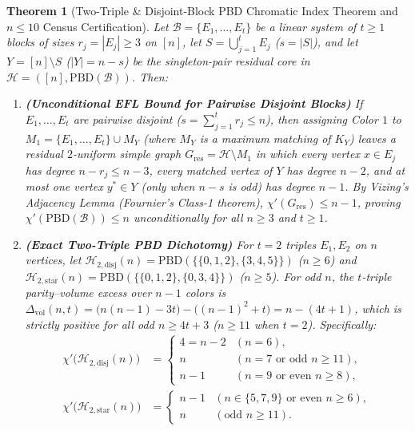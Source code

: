 \documentclass[11pt,reqno]{amsart}
\newtheorem{theorem}{Theorem}[section]
\theoremstyle{definition}
\theoremstyle{remark}
\begin{document}
\begin{theorem}[Two-Triple \& Disjoint-Block PBD Chromatic Index Theorem and $n \le 10$ Census Certification]\label{thm:two_triple_disjoint}
Let $\mathcal{B} = \{E_1, \dots, E_t\}$ be a linear system of $t \ge 1$ blocks of sizes $r_j = |E_j| \ge 3$ on $[n]$, let $S = \bigcup_{j=1}^t E_j$ ($s = |S|$), and let $Y = [n] \setminus S$ ($|Y| = n - s$) be the singleton-pair residual core in $\mathcal{H} = ([n], \mathrm{PBD}(\mathcal{B}))$. Then:
\begin{enumerate}
  \item[\textup{(i)}] \textbf{(Unconditional EFL Bound for Pairwise Disjoint Blocks)} If $E_1, \dots, E_t$ are pairwise disjoint ($s = \sum_{j=1}^t r_j \le n$), then assigning Color $1$ to $M_1 = \{E_1, \dots, E_t\} \cup M_Y$ (where $M_Y$ is a maximum matching of $K_Y$) leaves a residual $2$-uniform simple graph $G_{\mathrm{res}} = \mathcal{H} \setminus M_1$ in which every vertex $x \in E_j$ has degree $n - r_j \le n - 3$, every matched vertex of $Y$ has degree $n - 2$, and at most one vertex $y^* \in Y$ (only when $n - s$ is odd) has degree $n - 1$. By Vizing's Adjacency Lemma (Fournier's Class-1 theorem), $\chi'(G_{\mathrm{res}}) \le n - 1$, proving $\chi'(\mathrm{PBD}(\mathcal{B})) \le n$ unconditionally for all $n \ge 3$ and $t \ge 1$.
  \item[\textup{(ii)}] \textbf{(Exact Two-Triple PBD Dichotomy)} For $t = 2$ triples $E_1, E_2$ on $n$ vertices, let $\mathcal{H}_{2,\mathrm{disj}}(n) = \mathrm{PBD}(\{\{0,1,2\},\{3,4,5\}\})$ ($n \ge 6$) and $\mathcal{H}_{2,\mathrm{star}}(n) = \mathrm{PBD}(\{\{0,1,2\},\{0,3,4\}\})$ ($n \ge 5$). For odd $n$, the $t$-triple parity--volume excess over $n - 1$ colors is $\Delta_{\mathrm{vol}}(n, t) = \bigl(n(n-1) - 3t\bigr) - \bigl((n-1)^2 + t\bigr) = n - (4t + 1)$, which is strictly positive for all odd $n \ge 4t + 3$ ($n \ge 11$ when $t = 2$). Specifically:
  \begin{equation}\label{eq:two_triple_exact}
    \begin{aligned}
      \chi'\bigl(\mathcal{H}_{2,\mathrm{disj}}(n)\bigr) &= \begin{cases} 4 = n - 2 & (n = 6), \\ n & (n = 7 \text{ or odd } n \ge 11), \\ n - 1 & (n = 9 \text{ or even } n \ge 8), \end{cases} \\
      \chi'\bigl(\mathcal{H}_{2,\mathrm{star}}(n)\bigr) &= \begin{cases} n - 1 & (n \in \{5, 7, 9\} \text{ or even } n \ge 6), \\ n & (\text{odd } n \ge 11). \end{cases}

\end{aligned}
\end{equation}
\end{enumerate}
\end{theorem}
\end{document}
